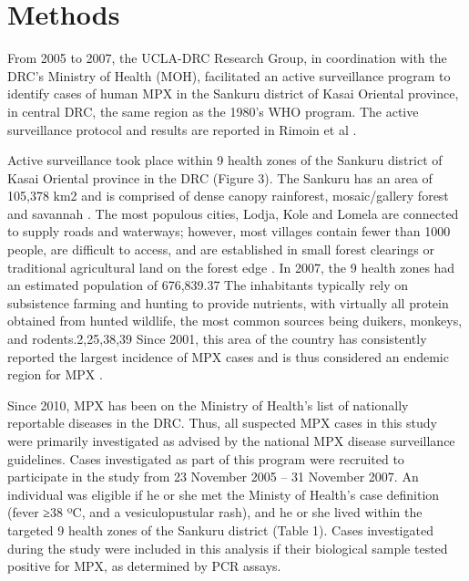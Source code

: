 \section{Methods}

From 2005 to 2007, the UCLA-DRC Research Group, in coordination with the DRC’s Ministry of Health (MOH), facilitated an active surveillance program to identify cases of human MPX in the Sankuru district of Kasai Oriental province, in central DRC, the same region as the 1980’s WHO program. The active surveillance protocol and results are reported in Rimoin et al \cite{Rimoin2010}.

Active surveillance took place within 9 health zones of the Sankuru district of Kasai Oriental province in the DRC (Figure 3). The Sankuru has an area of 105,378 km2 and is comprised of dense canopy rainforest, mosaic/gallery forest and savannah \cite{Fuller2011}. The most populous cities, Lodja, Kole and Lomela are connected to supply roads and waterways; however, most villages contain fewer than 1000 people, are difficult to access, and are established in small forest clearings or traditional agricultural land on the forest edge \cite{Rimoin2010}. In 2007, the 9 health zones had an estimated population of 676,839.37 The inhabitants typically rely on subsistence farming and hunting to provide nutrients, with virtually all protein obtained from hunted wildlife, the most common sources being duikers, monkeys, and rodents.2,25,38,39 Since 2001, this area of the country has consistently reported the largest incidence of MPX cases and is thus considered an endemic region for MPX \cite{Rimoin2010}. 

Since 2010, MPX has been on the Ministry of Health's list of nationally reportable diseases in the DRC. Thus, all suspected MPX cases in this study were primarily investigated as advised by the national MPX disease surveillance guidelines. Cases investigated as part of this program were recruited to participate in the study from 23 November 2005 – 31 November 2007. An individual was eligible if he or she met the Ministy of Health’s case definition (fever ≥38 ºC, and a vesiculopustular rash), and he or she lived within the targeted 9 health zones of the Sankuru district (Table 1). Cases investigated during the study were included in this analysis if their biological sample tested positive for MPX, as determined by PCR assays. 





